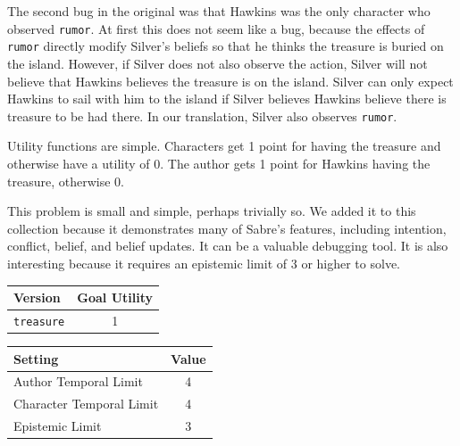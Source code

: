 \documentclass{nilreport}
\begin{document}
The second bug in the original was that Hawkins was the only character
who observed \texttt{rumor}. At first this does not seem like a bug,
because the effects of \texttt{rumor} directly modify Silver's beliefs
so that he thinks the treasure is buried on the island. However, if
Silver does not also observe the action, Silver will not believe that
Hawkins believes the treasure is on the island. Silver can only expect
Hawkins to sail with him to the island if Silver believes Hawkins
believe there is treasure to be had there. In our translation, Silver
also observes \texttt{rumor}.

Utility functions are simple. Characters get 1 point for having the
treasure and otherwise have a utility of 0. The author gets 1 point
for Hawkins having the treasure, otherwise 0.

This problem is small and simple, perhaps trivially so. We added it
to this collection because it demonstrates many of Sabre's features,
including intention, conflict, belief, and belief updates. It can
be a valuable debugging tool. It is also interesting because it requires
an epistemic limit of 3 or higher to solve.

\medskip{}
\noindent{}

\medskip{}

\begin{center}
\begin{tabular}[t]{|l|c|}
\hline 
\textbf{Version} & \textbf{Goal Utility}\tabularnewline
\hline 
\hline 
\texttt{treasure} & 1\tabularnewline
\hline 
\end{tabular}\textbf{\quad{}}%
\begin{tabular}[t]{|l|c|}
\hline 
\textbf{Setting} & \textbf{Value}\tabularnewline
\hline 
\hline 
Author Temporal Limit & 4\tabularnewline
\hline 
Character Temporal Limit & 4\tabularnewline
\hline 
Epistemic Limit & 3\tabularnewline
\hline 
\end{tabular}
\par\end{center}
\end{document}
